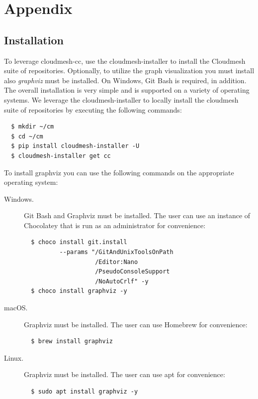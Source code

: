 \documentclass[sigplan,screen]{acmart}
\newcommand{\FILE}[1]{}
\begin{document}






\appendix

\section{Appendix}

% 

\FILE{installation.tex}

\subsection{Installation}\label{installation}

To leverage cloudmesh-cc, use the cloudmesh-installer to install the
Cloudmesh suite of repositories. Optionally, to utilize the graph
visualization you must install also {\em graphviz} must be
installed. On Windows, Git Bash is required, in addition. The overall
installation is very simple and is supported on a variety of operating
systems. We leverage the cloudmesh-installer to locally install the
cloudmesh suite of repositories by executing the following commands:

{\scriptsize\begin{verbatim}
  $ mkdir ~/cm
  $ cd ~/cm
  $ pip install cloudmesh-installer -U
  $ cloudmesh-installer get cc
\end{verbatim}}

To install graphviz you can use the following commands on the
appropriate operating system:

\begin{description}

\item[Windows.]  Git Bash and Graphviz must be installed. The user
can use an instance of Chocolatey that is run as an administrator for
convenience:

{\scriptsize\begin{verbatim}
  $ choco install git.install
          --params "/GitAndUnixToolsOnPath
                    /Editor:Nano
                    /PseudoConsoleSupport
                    /NoAutoCrlf" -y
  $ choco install graphviz -y
\end{verbatim}}

\item[macOS.] Graphviz must be installed. The user can use Homebrew
for convenience:

{\scriptsize\begin{verbatim}
  $ brew install graphviz
\end{verbatim}}

\item[Linux.] Graphviz must be installed. The user can use apt for
convenience:

{\scriptsize\begin{verbatim}
  $ sudo apt install graphviz -y
\end{verbatim}}

\end{description}
\end{document}
